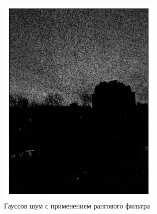 \documentclass[a4paper,12pt]{article}
\begin{document}
\begin{figure}[H]
    \begin{minipage}{0.49\textwidth}
        \centering \includegraphics[width=\textwidth]{results/nlf_gaus_3.png}
        \caption{Гауссов шум с применением рангового фильтра}
    \end{minipage}\hfill
    \begin{minipage}{0.49\textwidth}

\end{minipage}
\end{figure}
\end{document}
